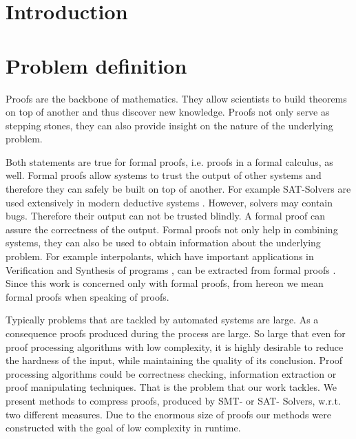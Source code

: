\section{Introduction}

\section{Problem definition}

Proofs are the backbone of mathematics. 
They allow scientists to build theorems on top of another and thus discover new knowledge.
Proofs not only serve as stepping stones, they can also provide insight on the nature of the underlying problem.

Both statements are true for formal proofs, i.e. proofs in a formal calculus, as well.
Formal proofs allow systems to trust the output of other systems and therefore they can safely be built on top of another. 
For example SAT-Solvers are used extensively in modern deductive systems \cite{Biere2009}. 
However, solvers may contain bugs. 
Therefore their output can not be trusted blindly.
A formal proof can assure the correctness of the output.
Formal proofs not only help in combining systems, they can also be used to obtain information about the underlying problem.
For example interpolants, which have important applications in Verification and Synthesis of programs \cite{McMill2005}, can be extracted from formal proofs \cite{Hofferek2013}.
Since this work is concerned only with formal proofs, from hereon we mean formal proofs when speaking of proofs.

Typically problems that are tackled by automated systems are large. 
As a consequence proofs produced during the process are large.
So large that even for proof processing algorithms with low complexity, it is highly desirable to reduce the hardness of the input, while maintaining the quality of its conclusion.
Proof processing algorithms could be correctness checking, information extraction or proof manipulating techniques.
That is the problem that our work tackles.
We present methods to compress proofs, produced by SMT- or SAT- Solvers, w.r.t. two different measures.
Due to the enormous size of proofs our methods were constructed with the goal of low complexity in runtime.

